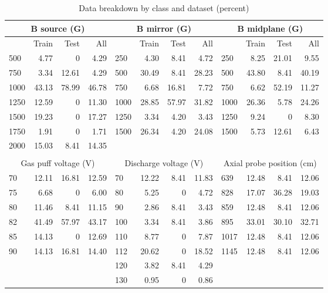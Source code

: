 \begin{table}
\small
	\centering
	\caption{Data breakdown by class and dataset (percent)}
	\label{tab:data_frac}
	\begin{tabular}{lrrr|lrrr|lrrr}
		\multicolumn{4}{c|}{B source (G)} & \multicolumn{4}{c|}{B mirror (G)} & \multicolumn{4}{c}{B midplane (G)}\\
		\hline \hline
		& Train & Test & All && Train & Test & All && Train & Test & All \\
		500 & 4.77 & 0 & 4.29 & 250 & 4.30 & 8.41 & 4.72 & 250 & 8.25 & 21.01 & 9.55 \\
		750 & 3.34 & 12.61 & 4.29 & 500 & 30.49 & 8.41 & 28.23 & 500 & 43.80 & 8.41 & 40.19 \\
		1000 & 43.13 & 78.99 & 46.78 & 750 & 6.68 & 16.81 & 7.72 & 750 & 6.62 & 52.19 & 11.27 \\
		1250 & 12.59 & 0 & 11.30 & 1000 & 28.85 & 57.97 & 31.82 & 1000 & 26.36 & 5.78 & 24.26 \\
		1500 & 19.23 & 0 & 17.27 & 1250 & 3.34 & 4.20 & 3.43 & 1250 & 9.24 & 0 & 8.30 \\
		1750 & 1.91 & 0 & 1.71 & 1500 & 26.34 & 4.20 & 24.08 & 1500 & 5.73 & 12.61 & 6.43 \\
		2000 & 15.03 & 8.41 & 14.35 & & & & & & & & \\
		\\
		\multicolumn{4}{c|}{Gas puff voltage (V)} & \multicolumn{4}{c|}{Discharge voltage (V)} & \multicolumn{4}{c}{Axial probe position (cm)} \\
		\hline \hline
		70 & 12.11 & 16.81 & 12.59  & 70 & 12.22 & 8.41 & 11.83    & 639 & 12.48 & 8.41 & 12.06 \\
		75 & 6.68 & 0 & 6.00     & 80 & 5.25 & 0 & 4.72      & 828 & 17.07 & 36.28 & 19.03 \\
		80 & 11.46 & 8.41 & 11.15   & 90 & 2.86 & 8.41 & 3.43      & 859 & 12.48 & 8.41 & 12.06  \\
		82 & 41.49 & 57.97 & 43.17  & 100 & 3.34 & 8.41 & 3.86     & 895 & 33.01 & 30.10 & 32.71 \\
		85 & 14.13 & 0 & 12.69   & 110 & 8.77 & 0 & 7.87     & 1017 & 12.48 & 8.41 & 12.06 \\
		90 & 14.13 & 16.81 & 14.40  & 112 & 20.62 & 0 & 18.52   & 1145 & 12.48 & 8.41 & 12.06 \\
                      & & & & 120 & 3.82 & 8.41 & 4.29     &                       & & & \\
                      & & & & 130 & 0.95 & 0 & 0.86     &                       & & & \\

\end{tabular}
\end{table}
